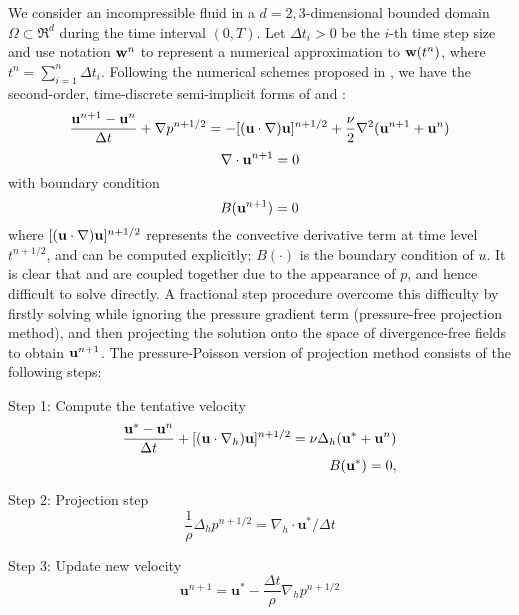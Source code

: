 We consider an incompressible fluid in a $d = 2, 3$-dimensional bounded domain $\Omega \subset \Re^d$ during the time interval $(0, T)$. Let $\Delta t_i > 0$ be the $i$-th time step size and use notation $\mathbf{w}^n$ to represent a numerical approximation to $\mathbf{w}(t^n)$, where $t^n = \sum_{i = 1}^{n}\Delta t_i$. Following the numerical schemes proposed in \cite{Brown2001Accurate}, we have the second-order, time-discrete semi-implicit forms of  and :
\begin{equation}
\frac{\mathbf{u}^{n+1} - \mathbf{u}^n}{\Delta t} + \nabla p^{n+1/2} = 
-[(\mathbf{u}\cdot\nabla)\mathbf{u}]^{n+1/2} + \frac{\nu}{2}\nabla^2(\mathbf{u}^{n+1} + \mathbf{u}^n)
\label{dis_mom_eqn}
\end{equation}
\begin{equation}
\nabla\cdot\mathbf{u}^{n+1} = 0
\label{dis_div_free}
\end{equation}
with boundary condition
\begin{equation}
B(\mathbf{u}^{n+1}) = 0
\label{ns_bc}
\end{equation}
where $[(\mathbf{u}\cdot\nabla)\mathbf{u}]^{n+1/2}$ represents the convective derivative term at time level $t^{n+1/2}$, and can be computed explicitly\cite{Kim1985Application}; $B(\cdot)$ is the boundary condition of $u$. It is clear that  and  are coupled together due to the appearance of $p$, and hence difficult to solve directly. A fractional step procedure overcome this difficulty by firstly solving  while ignoring the pressure gradient term (pressure-free projection method), and then projecting the solution onto the space of divergence-free fields to obtain $\mathbf{u}^{n+1}$. The pressure-Poisson version of projection method consists of the following steps:

Step 1: Compute the tentative velocity
\begin{eqnarray}
\frac{\mathbf{u}^*-\mathbf{u}^n}{\Delta t}+
[(\mathbf{u}\cdot\nabla_h)\mathbf{u}]^{n+1/2}
=\nu\Delta_h(\mathbf{u}^*+\mathbf{u}^n)\\ 
B(\mathbf{u}^*) = 0,
\label{tent_vel}
\end{eqnarray} 

Step 2: Projection step
\begin{equation} \frac{1}{\rho}\Delta_h p^{n+1/2} =
\nabla_h\cdot \mathbf{u}^*/\Delta t 
\end{equation}

Step 3: Update new velocity
\begin{equation} \mathbf{u}^{n+1} = \mathbf{u}^* -
\frac{\Delta t}{\rho}\nabla_h p^{n+1/2} \end{equation}

